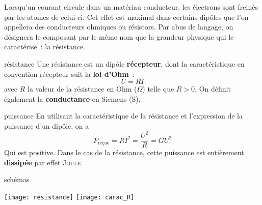 \documentclass[../main/main.tex]{subfiles}
\begin{document}
Lorsqu'un courant circule dans un matériau conducteur, les électrons sont
freinés par les atomes de celui-ci. Cet effet est maximal dans certains dipôles
que l'on appellera des conducteurs ohmiques ou résistors. Par abus de langage,
on désignera le composant par le même nom que la grandeur physique qui le
caractérise~: la résistance.

\begin{tcbraster}[raster columns=3, raster equal height=rows]
    \begin{defi}[label=def:resistance]{résistance}
        Une résistance est un dipôle \textbf{récepteur}, dont la caractéristique en
        convention récepteur suit la \textbf{loi d'Ohm}~:
        \[\boxed{U=RI}\]
        avec $R$ la valeur de la résistance en Ohm ($\Omega$) telle que $R > 0$. On
        définit également la \textbf{conductance}  en Siemens (S).
    \end{defi}
    \begin{impl}[label=impl:resistance]{puissance}
        En utilisant la caractéristique de la résistance et l'expression de la
        puissance d'un dipôle, on a
        \[ \boxed{P_{\text{reçue}} = RI^2 = \frac{U^2}{R} = GU^2}\]
        Qui est positive. Dans le cas de la résistance, cette puissance est
        entièrement \textbf{dissipée} par effet \textsc{Joule}.
    \end{impl}
    \begin{exem}[label=exem:resistance]{schémas}
        \begin{center}
            \texttt{[image: resistance]}
            \texttt{[image: carac\_R]}
        \end{center}
    \end{exem}
\end{tcbraster}
\end{document}
